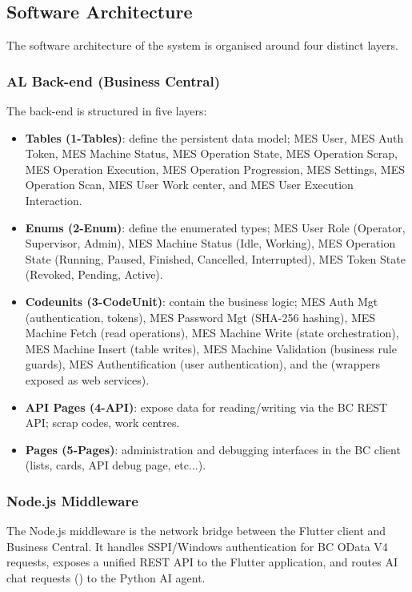 \subsection{Software Architecture}

The software architecture of the system is organised around four distinct layers.

\subsubsection*{AL Back-end (Business Central)}

The back-end is structured in five layers:

\begin{itemize}
	\item \textbf{Tables (1-Tables)}: define the persistent data model; 
	MES User, MES Auth Token, MES Machine Status, MES Operation State, 
	MES Operation Scrap, MES Operation Execution, MES Operation Progression,
	MES Settings, MES Operation Scan, MES User Work center, and MES User Execution Interaction.
	\item \textbf{Enums (2-Enum)}: define the enumerated types; MES User 
	Role (Operator, Supervisor, Admin), MES Machine Status (Idle, Working), 
	MES Operation State (Running, Paused, Finished, Cancelled, Interrupted), 
	MES Token State (Revoked, Pending, Active).
	\item \textbf{Codeunits (3-CodeUnit)}: contain the business logic; 
	MES Auth Mgt (authentication, tokens), MES Password Mgt (SHA-256 hashing), 
	MES Machine Fetch (read operations), MES Machine Write (state orchestration),
	MES Machine Insert (table writes), MES Machine Validation (business rule guards),
	MES Authentification (user authentication), and the 
	(wrappers exposed as web services).
	\item \textbf{API Pages (4-API)}: expose data for reading/writing via the BC REST 
	API; scrap codes, work centres.
	\item \textbf{Pages (5-Pages)}: administration and debugging interfaces 
	in the BC client (lists, cards, API debug page, etc...).
\end{itemize}

\subsubsection*{Node.js Middleware}

	The Node.js middleware is the network bridge between the Flutter client and
	Business Central. It handles SSPI/Windows authentication for BC OData V4
	requests, exposes a unified REST API to the Flutter application, and routes
	AI chat requests () to the Python AI agent.

